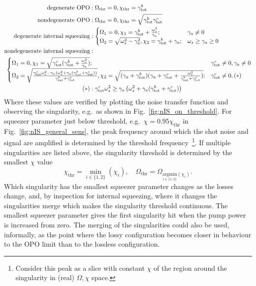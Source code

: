 \begin{align}\label{eq:singularity_threshold}
\text{degenerate OPO}&: \Omega_\text{thr}=0, \chi_\text{thr}=\gamma^b_\mathrm{tot}\\
\text{nondegenerate OPO}&: \Omega_\text{thr}=0, \chi_\text{thr}=\sqrt{\gamma^b_\mathrm{tot}\gamma^c_\text{tot}}\\
\text{degenerate internal squeezing}&:\begin{cases}
\Omega_1=0, \chi_1=\gamma^b_\mathrm{tot}+\frac{\omega_s^2}{\gamma_a};&\gamma_a\neq0\\
\Omega_2=\sqrt{\omega_s^2-\gamma_a^2}, \chi_2=\gamma^b_\mathrm{tot}+\gamma_a;&\omega_s\geq\gamma_a\geq0
\end{cases}\\
\text{nondegenerate internal squeezing}&:\\&\hspace{-5cm}\begin{cases}
\Omega_1=0, \chi_1=\sqrt{\gamma^c_\text{tot}(\gamma^b_\mathrm{tot}+\frac{\omega_s^2}{\gamma_a})};&\gamma^c_\text{tot}\neq0,\gamma_a\neq0\\
\Omega_2=\sqrt{\frac{\gamma^c_\text{tot}\omega_s^2-\gamma_a(\omega_s^2+\gamma_a(\gamma^b_\mathrm{tot}+\gamma^c_\text{tot}))}{\gamma^b_\mathrm{tot}+\gamma^c_\text{tot}}}, \chi_2=\sqrt{(\gamma_a+\gamma^b_\mathrm{tot})(\gamma_a+\gamma^c_\text{tot}+\frac{\omega_s^2}{\gamma^b_\mathrm{tot}+\gamma^c_\text{tot}})};&\gamma^c_\text{tot}\neq0,(*)
\end{cases}\\
(*)&:\gamma^c_\text{tot}\omega_s^2\geq\gamma_a\left(\omega_s^2+\gamma_a(\gamma^b_\mathrm{tot}+\gamma^c_\text{tot})\right)
\end{align}
\endgroup
Where these values are verified by plotting the noise transfer function and observing the singularity, e.g.\ as shown in Fig.~\ref{fig:nIS_on_threshold}. For squeezer parameter just below threshold, e.g.\ $\chi=0.95\chi_\text{thr}$ in Fig.~\ref{fig:nIS_general_sens}, the peak frequency around which the shot noise and signal are amplified is determined by the threshold frequency~\footnote{Consider this peak as a slice with constant $\chi$ of the region around the singularity in (real) $\Omega,\chi$ space.}. If multiple singularities are listed above, the singularity threshold is determined by the smallest $\chi$ value $$\chi_\text{thr}=\min_{i\in\{1,2\}}(\chi_i),\quad\Omega_\text{thr}=\Omega_{\underset{i\in\{1,2\}}{\text{argmin}}(\chi_i)}.$$ Which singularity has the smallest squeezer parameter changes as the losses change, and, by inspection for internal squeezing, where it changes the singularities merge which makes the singularity threshold continuous. The smallest squeezer parameter gives the first singularity hit when the pump power is increased from zero. The merging of the singularities could also be used, informally, as the point where the lossy configuration becomes closer in behaviour to the OPO limit than to the lossless configuration.

